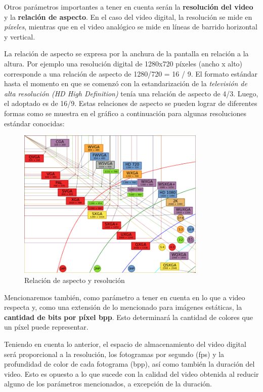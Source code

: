 \documentclass[12pt]{article}
\begin{document}
Otros parámetros importantes a tener en cuenta serán la {\bf resolución del video} y
la {\bf relación de aspecto}. En el caso del video digital, la resolución 
se mide en {\it píxeles}, mientras que en el video analógico se mide en 
líneas de barrido horizontal y vertical. 

La relación de aspecto se expresa por la anchura de la pantalla en relación a la altura. 
Por ejemplo una resolución digital de 1280x720 píxeles (ancho x alto) corresponde 
a una relación de aspecto de 1280/720 = 16 / 9. 
El formato estándar hasta el momento en que se comenzó con la estandarización de 
la {\it televisión de alta resolución (HD High Definition)} tenía una relación de 
aspecto de 4/3. Luego, el adoptado es de 16/9. Estas relaciones de aspecto se 
pueden lograr de diferentes formas como se muestra en el gráfico a continuación
para algunas resoluciones estándar conocidas:

\begin{figure}[h]
\centering
\includegraphics[width=0.8\textwidth]{resol.png}
\renewcommand{\figurename}{Fig.}
\caption{Relación de aspecto y resolución}
\label{contexto:figura}
\end{figure}

Mencionaremos también, como parámetro a tener en cuenta en lo que a video respecta
y, como una extensión de lo mencionado para imágenes estáticas, la {\bf cantidad de 
bits por píxel bpp}. Esto determinará la cantidad de colores que un píxel 
puede representar. 

Teniendo en cuenta lo anterior, el espacio de almacenamiento del video digital 
será proporcional a la resolución, los fotogramas por segundo (fps) y la 
profundidad de color de cada fotograma (bpp), así como también la duración 
del video. Esto es opuesto a lo que sucede
con la calidad del video obtenida al reducir alguno de los parámetros mencionados, 
a excepción de la duración. 
\end{document}
